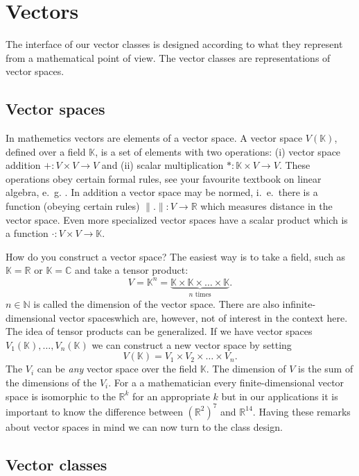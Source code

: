 \documentclass[11pt]{article}
\newcommand{\C}{\mathbb{C}}
\newcommand{\R}{\mathbb{R}}
\newcommand{\N}{\mathbb{N}}
\newcommand{\K}{\mathbb{K}}
\begin{document}
\section{Vectors}

The interface of our vector classes is designed according to what they
represent from a mathematical point of view. The vector classes are
representations of vector spaces.

\subsection{Vector spaces}

In mathemetics vectors are elements of a vector space. A vector space
$V(\K)$, defined over a field $\K$, is a set of elements with two
operations: (i) vector space addition $+ : V\times V \to V$ and (ii) scalar
multiplication $* : \K\times V \to V$. These operations obey certain formal
rules, see your favourite textbook on linear algebra,
e.~g. \cite{LaBook}. In addition a 
vector space may be normed, i.~e.~there is a function (obeying certain
rules) $\|.\| : V \to \R$ which measures distance in the vector
space. Even more specialized vector spaces have a scalar product which
is a function $\cdot : V\times V \to \K$. 

How do you construct a vector space? The easiest way is to take a
field, such as $\K=\R$ or $\K=\C$ and take a tensor product:
\begin{equation*}
V = \K^n = \underbrace{\K\times\K\times\ldots\times\K}_{\text{$n$ times}}.
\end{equation*} 
$n\in\N$ is called the dimension of the vector space. There are also
infinite-dimensional vector spaceswhich are, however, not of interest
in the context here. The idea of tensor products can be generalized.
If we have vector spaces $V_1(\K),\ldots,V_n(\K)$ we can construct a
new vector space by setting
\begin{equation*}
V(\K) = V_1\times V_2 \times \ldots \times V_n.
\end{equation*} 
The $V_i$ can be \textit{any} vector space over the field $\K$. The
dimension of $V$ is the sum of the dimensions of the $V_i$. For a
a mathematician every finite-dimensional vector space is isomorphic to
the $\R^k$ for an appropriate $k$ but in our applications it is
important to know the difference between $(\R^2)^7$ and
$\R^{14}$. Having these remarks about vector spaces in mind we can now
turn to the class design.

\subsection{Vector classes}
\end{document}
